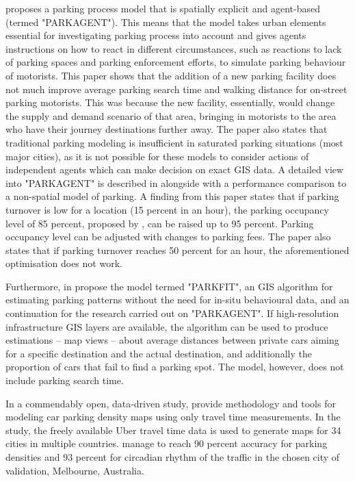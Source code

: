  proposes a parking process model that is spatially explicit and agent-based (termed "PARKAGENT"). This means that the model takes urban elements essential for investigating parking process into account and gives agents instructions on how to react in different circumstances, such as reactions to lack of parking spaces and parking enforcement efforts, to simulate parking behaviour of motorists. This paper shows that the addition of a new parking facility does not much improve average parking search time and walking distance for on-street parking motorists. This was because the new facility, essentially, would change the supply and demand scenario of that area, bringing in motorists to the area who have their journey destinations further away. The paper also states that traditional parking modeling is insufficient in saturated parking situations (most major cities), as it is not possible for these models to consider actions of independent agents which can make decision on exact GIS data. A detailed view into "PARKAGENT" is described in  alongside with a performance comparison to a non-spatial model of parking. A finding from this paper states that if parking turnover is low for a location (15 percent in an hour), the parking occupancy level of 85 percent, proposed by , can be raised up to 95 percent. Parking occupancy level can be adjusted with changes to parking fees. The paper also states that if parking turnover reaches 50 percent for an hour, the aforementioned optimisation does not work.

Furthermore, in  propose the model termed "PARKFIT", an GIS algorithm for estimating parking patterns without the need for in-situ behavioural data, and an continuation for the research carried out on "PARKAGENT". If high-resolution infrastructure GIS layers are available, the algorithm can be used to produce estimations -- map views -- about average distances between private cars aiming for a specific destination and the actual destination, and additionally the proportion of cars that fail to find a parking spot. The model, however, does not include parking search time. 

In a commendably open, data-driven study,  provide methodology and tools for modeling car parking density maps using only travel time measurements. In the study, the freely available Uber travel time data is used to generate maps for 34 cities in multiple countries. \citeauthor{Aryandoust2019} manage to reach 90 percent accuracy for parking densities and 93 percent for circadian rhythm of the traffic in the chosen city of validation, Melbourne, Australia.


